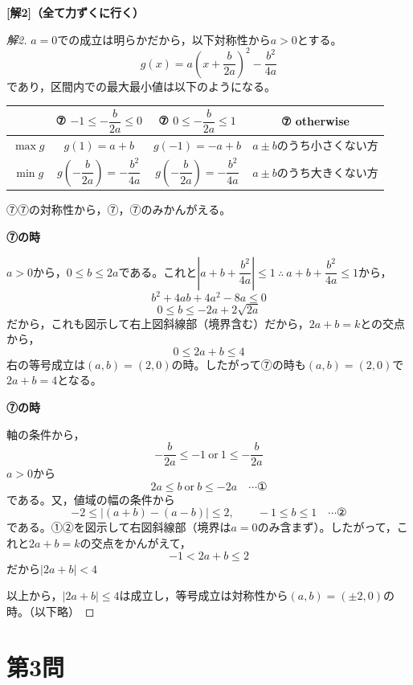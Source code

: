 \documentclass[../main.tex]{subfiles}
\begin{document}
\bigskip
\noindent\textbf{[解2]（全て力ずくに行く）}

\begin{proof}[解2]
  $a=0$での成立は明らかだから，以下対称性から$a>0$とする。
  \[
    g(x)=a\left(x+\frac{b}{2a}\right)^2-\frac{b^2}{4a}
  \]
  であり，区間内での最大最小値は以下のようになる。
  \begin{center}
    \begin{tabular}{c|c|c|c}
      & ⑦ $-1\le-\dfrac{b}{2a}\le0$ & ⑦ $0\le-\dfrac{b}{2a}\le1$ & ⑦ otherwise \\
      \hline
      $\max g$ & $g(1)=a+b$ & $g(-1)=-a+b$ & $a\pm b$のうち小さくない方 \\
      \hline
      $\min g$ & $g\left(-\dfrac{b}{2a}\right)=-\dfrac{b^2}{4a}$ & $g\left(-\dfrac{b}{2a}\right)=-\dfrac{b^2}{4a}$ & $a\pm b$のうち大きくない方
    \end{tabular}
  \end{center}
  ⑦⑦の対称性から，⑦，⑦のみかんがえる。

  \textbf{⑦の時}

  $a>0$から，$0\le b\le2a$である。これと$\left|a+b+\dfrac{b^2}{4a}\right|\le1\ \therefore\ a+b+\dfrac{b^2}{4a}\le1$から，
  \[
    b^2+4ab+4a^2-8a\le0
  \]
  \[
    0\le b\le-2a+2\sqrt{2a}
  \]
  だから，これも図示して右上図斜線部（境界含む）だから，$2a+b=k$との交点から，
  \[
    0\le2a+b\le4
  \]
  右の等号成立は$(a,b)=(2,0)$の時。したがって⑦の時も$(a,b)=(2,0)$で$2a+b=4$となる。

  \textbf{⑦の時}

  軸の条件から，
  \[
    -\frac{b}{2a}\le-1 \ \text{or}\ 1\le-\frac{b}{2a}
  \]
  $a>0$から
  \[
    2a\le b \ \text{or}\ b\le-2a \quad\cdots\text{①}
  \]
  である。又，値域の幅の条件から
  \[
    -2\le\bigl|(a+b)-(a-b)\bigr|\le2, \qquad -1\le b\le1 \quad\cdots\text{②}
  \]
  である。①②を図示して右図斜線部（境界は$a=0$のみ含まず）。したがって，これと$2a+b=k$の交点をかんがえて，
  \[
    -1<2a+b\le2
  \]
  だから$|2a+b|<4$

  以上から，$|2a+b|\le4$は成立し，等号成立は対称性から$(a,b)=(\pm2,0)$の時。（以下略）
\end{proof}

\newpage

\section*{第3問}
\end{document}
